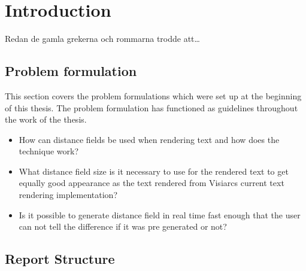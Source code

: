 \chapter{Introduction}\label{cha:intro}
Redan de gamla grekerna och rommarna trodde att\dots
\section{Problem formulation}
This section covers the problem formulations which were set up at the beginning of this thesis. The problem formulation has functioned as guidelines throughout the work of the thesis.
\begin{itemize}
  \item How can distance fields be used when rendering text and how does the technique work?
  \item What distance field size is it necessary to use for the rendered text to get equally good appearance as the text rendered from Visiarcs current text rendering implementation?
  \item Is it possible to generate distance field in real time fast enough that the user can not tell the difference if it was pre generated or not?
\end{itemize}
\section{Report Structure}

